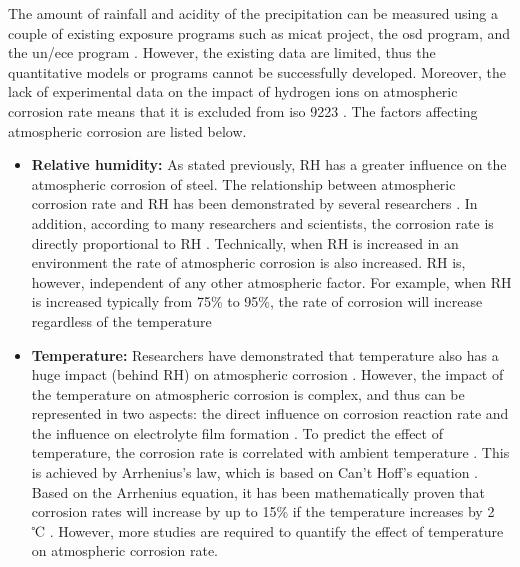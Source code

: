 The amount of rainfall and acidity of the precipitation can be measured using a couple of existing exposure programs such as \Acrfull{micat} project, the \Acrfull{osd} program, and the \Acrfull{un/ece} program \cite{cai2018influence}. However, the existing data are limited, thus the quantitative models or programs cannot be successfully developed. Moreover, the lack of experimental data on the impact of hydrogen ions on atmospheric corrosion rate means that it is excluded from \acrshort{iso} 9223 \cite{protopopoff2011surface}. The factors affecting atmospheric corrosion are listed below.

\begin{itemize}
    \item \textbf{Relative humidity:} As stated previously, RH has a greater influence on the atmospheric corrosion of steel. The relationship between atmospheric corrosion rate and RH has been demonstrated by several researchers \cite{dong2005deformation, islam2018effects}. In addition, according to many researchers and scientists, the corrosion rate is directly proportional to RH \cite{dong2005deformation, islam2018effects}. Technically, when RH is increased in an environment the rate of atmospheric corrosion is also increased. RH is, however, independent of any other atmospheric factor. For example, when RH is increased typically from 75\% to 95\%, the rate of corrosion will increase regardless of the temperature \cite{sourmail2005stainless}
    
    \item \textbf{Temperature:}  Researchers have demonstrated that temperature also has a huge impact (behind RH) on atmospheric corrosion \cite{cengel1998heat, islam2018effects}. However, the impact of the temperature on atmospheric corrosion is complex, and thus can be represented in two aspects: the direct influence on corrosion reaction rate and the influence on electrolyte film formation \cite{cai2018influence}. To predict the effect of temperature, the corrosion rate is correlated with ambient temperature \cite{pei2021understanding}.  This is achieved by Arrhenius's law, which is based on Can't Hoff’s equation \cite{cai2018influence}. Based on the Arrhenius equation, it has been mathematically proven that corrosion rates will increase by up to 15\% if the temperature increases by 2 ℃ \cite{mcarthur2004engineering}. However, more studies are required to quantify the effect of temperature on atmospheric corrosion rate.  
    

\end{itemize}
